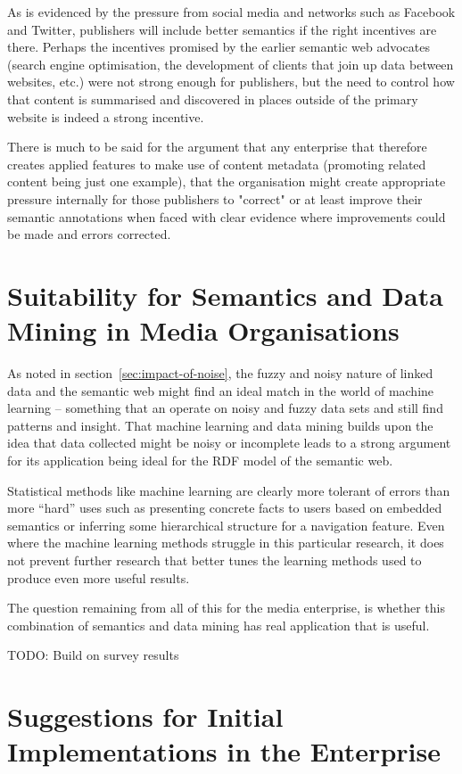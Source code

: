 As is evidenced by the pressure from social media and networks such as
Facebook and Twitter, publishers will include better semantics if the right
incentives are there. Perhaps the incentives promised by the earlier semantic
web advocates (search engine optimisation, the development of clients that
join up data between websites, etc.) were not strong enough for publishers,
but the need to control how that content is summarised and discovered in
places outside of the primary website is indeed a strong incentive.

There is much to be said for the argument that any enterprise that therefore
creates applied features to make use of content metadata (promoting related
content being just one example), that the organisation might create appropriate
pressure internally for those publishers to "correct" or at least improve
their semantic annotations when faced with clear evidence where improvements
could be made and errors corrected.

\section{Suitability for Semantics and Data Mining in Media Organisations}

As noted in section~\ref{sec:impact-of-noise}, the fuzzy and noisy nature
of linked data and the semantic web might find an ideal match in the world
of machine learning -- something that an operate on noisy and fuzzy data sets
and still find patterns and insight. That machine learning and data mining
builds upon the idea that data collected might be noisy or incomplete leads
to a strong argument for its application being ideal for the RDF model of
the semantic web.

Statistical methods like machine learning are clearly more tolerant of errors
than more ``hard'' uses such as presenting concrete facts to users based on
embedded semantics or inferring some hierarchical structure for a navigation
feature. Even where the machine learning methods struggle in this particular
research, it does not prevent further research that better tunes the learning
methods used to produce even more useful results.

The question remaining from all of this for the media enterprise, is whether
this combination of semantics and data mining has real application that is
useful.

TODO: Build on survey results

\section{Suggestions for Initial Implementations in the Enterprise}

